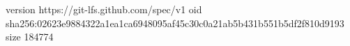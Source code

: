 version https://git-lfs.github.com/spec/v1
oid sha256:02623e9884322a1ea1ca6948095af45c30c0a21ab5b431b551b5df2f810d9193
size 184774
